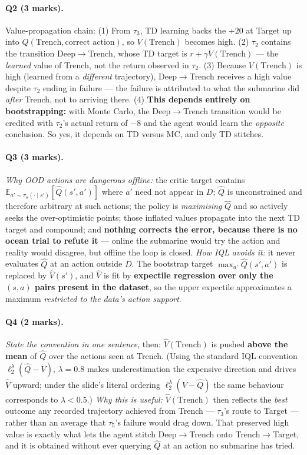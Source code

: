 \documentclass[11pt,a4paper]{article}
\begin{document}
\paragraph{Q2 (3 marks).} Value-propagation chain: (1) From $\tau_3$, TD
learning backs the $+20$ at Target up into
$Q(\text{Trench},\text{correct action})$, so $V(\text{Trench})$ becomes high.
(2) $\tau_2$ contains the transition Deep$\to$Trench, whose TD target is
$r+\gamma V(\text{Trench})$ --- the \emph{learned} value of Trench, not the
return observed in $\tau_2$. (3) Because $V(\text{Trench})$ is high (learned
from a \emph{different} trajectory), Deep$\to$Trench receives a high value
despite $\tau_2$ ending in failure --- the failure is attributed to what the
submarine did \emph{after} Trench, not to arriving there.
(4) \textbf{This depends entirely on bootstrapping:} with Monte Carlo, the
Deep$\to$Trench transition would be credited with $\tau_2$'s actual return of
$-8$ and the agent would learn the \emph{opposite} conclusion. So yes, it
depends on TD versus MC, and only TD stitches.

\paragraph{Q3 (3 marks).} \emph{Why OOD actions are dangerous offline:} the
critic target contains $\mathbb E_{a'\sim\pi_\theta(\cdot\mid s')}[\hat Q(s',a')]$
where $a'$ need not appear in $D$; $\hat Q$ is unconstrained and therefore
arbitrary at such actions; the policy is \emph{maximising} $\hat Q$ and so
actively seeks the over-optimistic points; those inflated values propagate
into the next TD target and compound; and \textbf{nothing corrects the error,
because there is no ocean trial to refute it} --- online the submarine would
try the action and reality would disagree, but offline the loop is closed.
\emph{How IQL avoids it:} it never evaluates $\hat Q$ at an action outside
$D$. The bootstrap target $\max_{a'}\hat Q(s',a')$ is replaced by
$\hat V(s')$, and $\hat V$ is fit by \textbf{expectile regression over only
the $(s,a)$ pairs present in the dataset}, so the upper expectile approximates
a maximum \emph{restricted to the data's action support}.

\paragraph{Q4 (2 marks).} \emph{State the convention in one sentence}, then:
$\hat V(\text{Trench})$ is pushed \textbf{above the mean} of $\hat Q$ over the
actions seen at Trench. (Using the standard IQL convention
$\ell_2^{\lambda}(\hat Q-V)$, $\lambda=0.8$ makes underestimation the
expensive direction and drives $\hat V$ upward; under the slide's literal
ordering $\ell_2^{\lambda}(V-\hat Q)$ the same behaviour corresponds to
$\lambda<0.5$.) \emph{Why this is useful:} $\hat V(\text{Trench})$ then
reflects the \emph{best} outcome any recorded trajectory achieved from Trench
--- $\tau_3$'s route to Target --- rather than an average that $\tau_5$'s
failure would drag down. That preserved high value is exactly what lets the
agent stitch Deep$\to$Trench onto Trench$\to$Target, and it is obtained
without ever querying $\hat Q$ at an action no submarine has tried.
\end{document}

